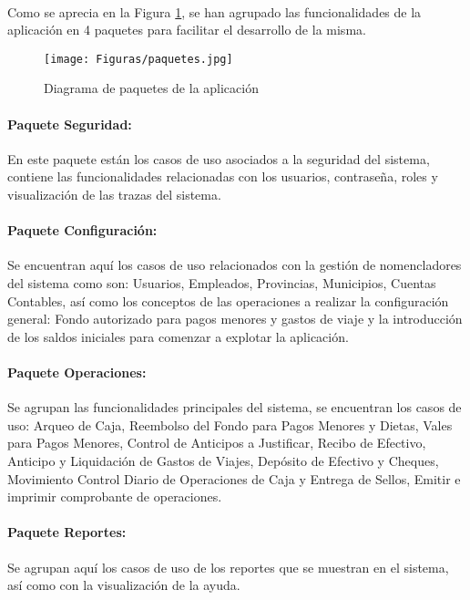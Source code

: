 \paragraph{}Como se aprecia en la Figura \ref{fig:Paquetes}, se han agrupado las funcionalidades de la aplicación en 4 paquetes para facilitar el desarrollo de la misma.

\begin{figure}[H] %
	\centering
	\texttt{[image: Figuras/paquetes.jpg]}
	\caption{Diagrama de paquetes de la aplicación}
	\label{fig:Paquetes}
\end{figure}

\paragraph{Paquete Seguridad:} En este paquete están los casos de uso asociados a la seguridad del sistema, contiene las funcionalidades relacionadas con los usuarios, contraseña, roles y visualización de las trazas del sistema.
\paragraph{Paquete Configuración:} Se encuentran aquí los casos de uso relacionados con la gestión de nomencladores del sistema como son: Usuarios, Empleados, Provincias, Municipios, Cuentas Contables, así como los conceptos de las operaciones a realizar la configuración general: Fondo autorizado para pagos menores y gastos de viaje y la introducción de los saldos iniciales para comenzar a explotar la aplicación.
\paragraph{Paquete Operaciones:} Se agrupan las funcionalidades principales del sistema, se encuentran los casos de uso: Arqueo de Caja, Reembolso del Fondo para Pagos Menores y Dietas, Vales para Pagos Menores, Control de Anticipos a Justificar, Recibo de Efectivo, Anticipo y Liquidación de Gastos de Viajes, Depósito de Efectivo y Cheques, Movimiento Control Diario de Operaciones de Caja y Entrega de Sellos, Emitir e imprimir comprobante de operaciones.
\paragraph{Paquete Reportes:} Se agrupan aquí los casos de uso de los reportes que se muestran en el sistema, así como con la visualización de la ayuda.

